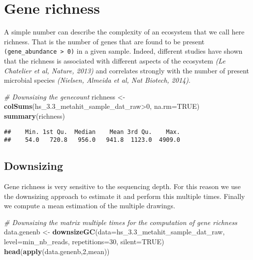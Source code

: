 \documentclass[]{article}
\newenvironment{Shaded}{\begin{snugshade}}{\end{snugshade}}
\newcommand{\KeywordTok}[1]{\textcolor[rgb]{0.13,0.29,0.53}{\textbf{{#1}}}}
\newcommand{\DataTypeTok}[1]{\textcolor[rgb]{0.13,0.29,0.53}{{#1}}}
\newcommand{\DecValTok}[1]{\textcolor[rgb]{0.00,0.00,0.81}{{#1}}}
\newcommand{\StringTok}[1]{\textcolor[rgb]{0.31,0.60,0.02}{{#1}}}
\newcommand{\CommentTok}[1]{\textcolor[rgb]{0.56,0.35,0.01}{\textit{{#1}}}}
\newcommand{\OtherTok}[1]{\textcolor[rgb]{0.56,0.35,0.01}{{#1}}}
\newcommand{\NormalTok}[1]{{#1}}
\begin{document}
\section{Gene richness}\label{gene-richness}

A simple number can describe the complexity of an ecosystem that we call
here richness. That is the number of genes that are found to be present
\texttt{(gene\_abundance \textgreater{} 0)} in a given sample. Indeed,
different studies have shown that the richness is associated with
different aspects of the ecosystem \emph{(Le Chatelier et al, Nature,
2013)} and correlates strongly with the number of present microbial
species \emph{(Nielsen, Almeida et al, Nat Biotech, 2014)}.

\begin{Shaded}
\begin{Highlighting}[]
\CommentTok{# Downsizing the genecount}
\NormalTok{richness <-}\StringTok{ }\KeywordTok{colSums}\NormalTok{(hs_3.3_metahit_sample_dat_raw>}\DecValTok{0}\NormalTok{, }\DataTypeTok{na.rm=}\OtherTok{TRUE}\NormalTok{)}
\KeywordTok{summary}\NormalTok{(richness)}
\end{Highlighting}
\end{Shaded}

\begin{verbatim}
##    Min. 1st Qu.  Median    Mean 3rd Qu.    Max. 
##    54.0   720.8   956.0   941.8  1123.0  4909.0
\end{verbatim}

\subsection{Downsizing}\label{downsizing-1}

Gene richness is very sensitive to the sequencing depth. For this reason
we use the downsizing approach to estimate it and perform this multiple
times. Finally we compute a mean estimation of the multiple drawings.

\begin{Shaded}
\begin{Highlighting}[]
\CommentTok{# Downsizing the matrix multiple times for the computation of gene richness}
\NormalTok{data.genenb <-}\StringTok{ }\KeywordTok{downsizeGC}\NormalTok{(}\DataTypeTok{data=}\NormalTok{hs_3.3_metahit_sample_dat_raw, }
                          \DataTypeTok{level=}\NormalTok{min_nb_reads, }\DataTypeTok{repetitions=}\DecValTok{30}\NormalTok{, }\DataTypeTok{silent=}\OtherTok{TRUE}\NormalTok{)}
\KeywordTok{head}\NormalTok{(}\KeywordTok{apply}\NormalTok{(data.genenb,}\DecValTok{2}\NormalTok{,mean))}
\end{Highlighting}
\end{Shaded}
\end{document}
